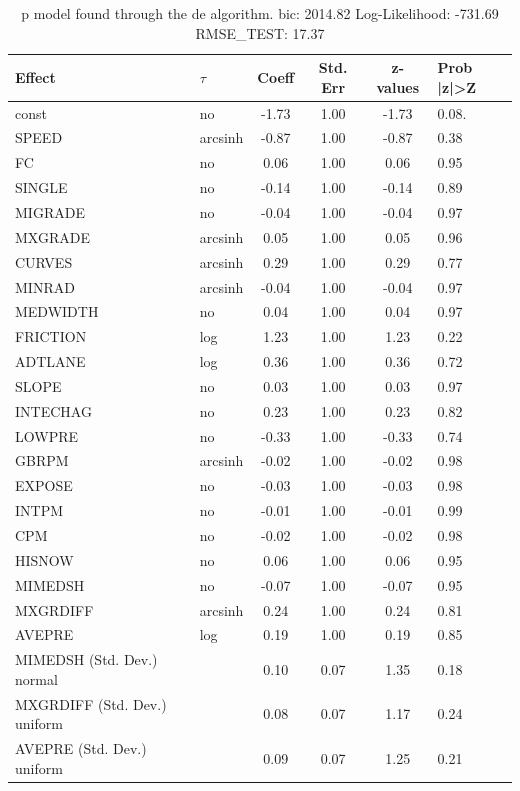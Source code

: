 \begin{table}
	\caption{p model found through the de algorithm. bic: 2014.82 Log-Likelihood: -731.69 RMSE_TEST: 17.37}
	\begin{center}
		\begin{tabular}{|l|l|c|c|c|l|}
			\hline
			Effect & $\tau$ & Coeff & Std. Err & z-values & Prob |z|>Z \\
			\hline
			const & no & -1.73 & 1.00 & -1.73 & 0.08. \\
			\hline
			SPEED & arcsinh & -0.87 & 1.00 & -0.87 & 0.38 \\
			\hline
			FC & no & 0.06 & 1.00 & 0.06 & 0.95 \\
			\hline
			SINGLE & no & -0.14 & 1.00 & -0.14 & 0.89 \\
			\hline
			MIGRADE & no & -0.04 & 1.00 & -0.04 & 0.97 \\
			\hline
			MXGRADE & arcsinh & 0.05 & 1.00 & 0.05 & 0.96 \\
			\hline
			CURVES & arcsinh & 0.29 & 1.00 & 0.29 & 0.77 \\
			\hline
			MINRAD & arcsinh & -0.04 & 1.00 & -0.04 & 0.97 \\
			\hline
			MEDWIDTH & no & 0.04 & 1.00 & 0.04 & 0.97 \\
			\hline
			FRICTION & log & 1.23 & 1.00 & 1.23 & 0.22 \\
			\hline
			ADTLANE & log & 0.36 & 1.00 & 0.36 & 0.72 \\
			\hline
			SLOPE & no & 0.03 & 1.00 & 0.03 & 0.97 \\
			\hline
			INTECHAG & no & 0.23 & 1.00 & 0.23 & 0.82 \\
			\hline
			LOWPRE & no & -0.33 & 1.00 & -0.33 & 0.74 \\
			\hline
			GBRPM & arcsinh & -0.02 & 1.00 & -0.02 & 0.98 \\
			\hline
			EXPOSE & no & -0.03 & 1.00 & -0.03 & 0.98 \\
			\hline
			INTPM & no & -0.01 & 1.00 & -0.01 & 0.99 \\
			\hline
			CPM & no & -0.02 & 1.00 & -0.02 & 0.98 \\
			\hline
			HISNOW & no & 0.06 & 1.00 & 0.06 & 0.95 \\
			\hline
			MIMEDSH & no & -0.07 & 1.00 & -0.07 & 0.95 \\
			\hline
			MXGRDIFF & arcsinh & 0.24 & 1.00 & 0.24 & 0.81 \\
			\hline
			AVEPRE & log & 0.19 & 1.00 & 0.19 & 0.85 \\
			\hline
			MIMEDSH (Std. Dev.) normal &  & 0.10 & 0.07 & 1.35 & 0.18 \\
			\hline
			MXGRDIFF (Std. Dev.) uniform &  & 0.08 & 0.07 & 1.17 & 0.24 \\
			\hline
			AVEPRE (Std. Dev.) uniform &  & 0.09 & 0.07 & 1.25 & 0.21 \\
			\hline
		\end{tabular}
	\end{center}
\end{table}